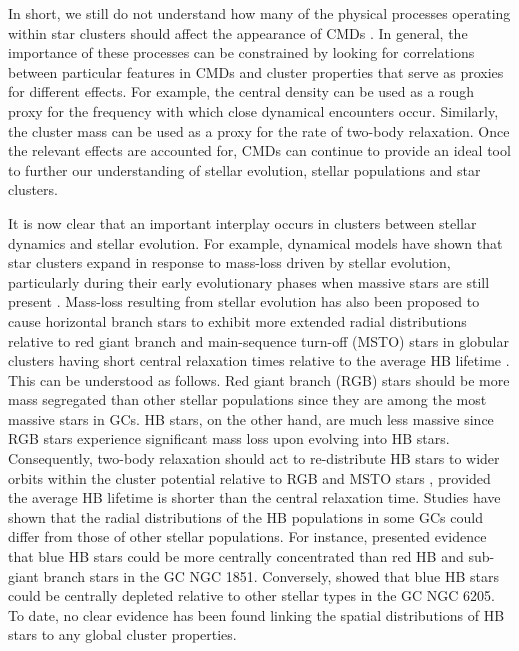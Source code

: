 In short, we still do 
not understand how many of the physical processes operating within
star clusters should affect the appearance of CMDs
\citep[e.g.][]{fusi92, buonanno97, ferraro99, beccari06}.  In general,
the importance of these processes can be constrained by looking for
correlations between particular features in CMDs and cluster properties
that serve as proxies for different effects.
For example, the central density can be used as a rough proxy for the
frequency with which close dynamical encounters occur.  Similarly, the
cluster mass can be used as a proxy for the rate of two-body relaxation.  
Once the relevant effects are accounted for, CMDs can continue to
provide an ideal tool to further our 
understanding of stellar evolution, stellar populations and star
clusters. 

It is now clear that an important interplay
occurs in clusters between stellar dynamics and stellar evolution.
For example, dynamical models have shown that 
star clusters expand in response to mass-loss driven by stellar
evolution, particularly during their early evolutionary phases when 
massive stars are still present \citep[e.g.][]{chernoff90, portegieszwart98,
  gieles10}.  Mass-loss resulting from stellar evolution has also been
proposed to cause horizontal branch stars to exhibit more
extended radial distributions relative to 
red giant branch and main-sequence turn-off (MSTO) stars in
globular clusters having short 
central relaxation times relative to the average HB lifetime
\citep[e.g.][]{sigurdsson95, leigh09}.  This can be understood as
follows.  Red giant branch (RGB) stars
should be more mass segregated than other stellar populations since
they are among the most massive stars in GCs.  HB stars, on the other
hand, are much less massive since RGB stars experience significant
mass loss upon evolving into HB stars.  Consequently, two-body
relaxation should act to 
re-distribute HB stars to wider orbits within the cluster potential
relative to RGB and MSTO stars \citep{spitzer75}, provided the average
HB lifetime is shorter than 
the central relaxation time.  Studies have shown that the radial
distributions of the HB populations in some GCs could differ from
those of other stellar populations.  For
instance, \citet{saviane98} 
presented evidence that blue HB stars could be more centrally
concentrated than red HB and sub-giant branch stars in the GC NGC
1851.  Conversely, \citet{cohen97} showed that blue HB stars could be
centrally depleted relative to other stellar types in the GC NGC
6205.  To date, no clear evidence has been found linking the spatial
distributions of HB stars to any global cluster properties.  

